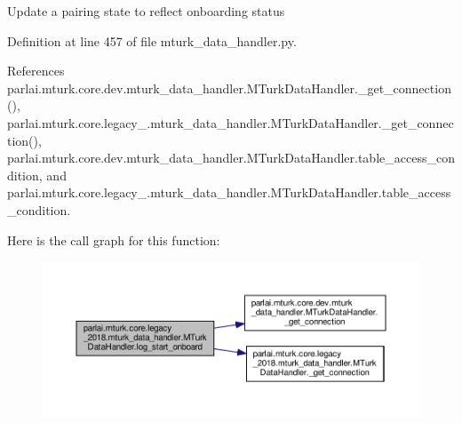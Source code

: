 \begin{DoxyVerb}Update a pairing state to reflect onboarding status\end{DoxyVerb}
 

Definition at line 457 of file mturk\+\_\+data\+\_\+handler.\+py.



References parlai.\+mturk.\+core.\+dev.\+mturk\+\_\+data\+\_\+handler.\+M\+Turk\+Data\+Handler.\+\_\+get\+\_\+connection(), parlai.\+mturk.\+core.\+legacy\+\_.\+mturk\+\_\+data\+\_\+handler.\+M\+Turk\+Data\+Handler.\+\_\+get\+\_\+connection(), parlai.\+mturk.\+core.\+dev.\+mturk\+\_\+data\+\_\+handler.\+M\+Turk\+Data\+Handler.\+table\+\_\+access\+\_\+condition, and parlai.\+mturk.\+core.\+legacy\+\_.\+mturk\+\_\+data\+\_\+handler.\+M\+Turk\+Data\+Handler.\+table\+\_\+access\+\_\+condition.

Here is the call graph for this function\+:
\nopagebreak
\begin{figure}[H]
\begin{center}
\leavevmode
\includegraphics[width=350pt]{classparlai_1_1mturk_1_1core_1_1legacy__2018_1_1mturk__data__handler_1_1MTurkDataHandler_a203c9543a46716e6e51d4d1e795385f5_cgraph}
\end{center}
\end{figure}
\mbox{\label{classparlai_1_1mturk_1_1core_1_1legacy__2018_1_1mturk__data__handler_1_1MTurkDataHandler_a79a42fda72f56a54462c91242fb0852b}} 
